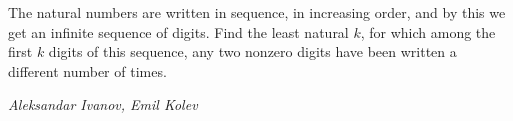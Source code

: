 The natural numbers are written in sequence, in increasing order, and by this we get an infinite sequence of digits. Find the least natural $k$, for which among the first $k$ digits of this sequence, any two nonzero digits have been written a different number of times.

\textit{Aleksandar Ivanov, Emil Kolev }